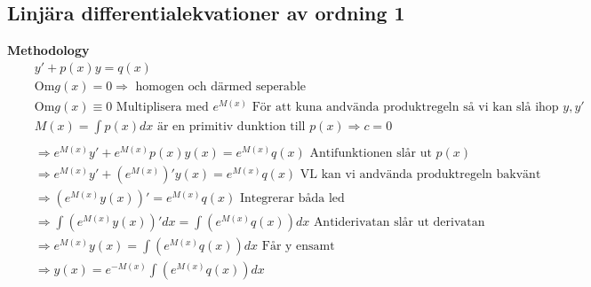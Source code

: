 \documentclass{article}
\begin{document}
\subsection{Linjära differentialekvationer av ordning 1}
\textbf{Methodology}  
\begin{align*}
  &\quad  y'+p(x)y = q(x)  \\
  &\quad  \text{Om} g(x)=0 \Rightarrow \text{ homogen och därmed seperable} \\
  &\quad  \text{Om} g(x)\equiv0 \text{ Multiplisera med } e^{M(x)} \text{ För att kuna andvända produktregeln
  så vi kan slå ihop } y, y' \\
  &\quad  M(x)= \int p(x)dx \text{ är en primitiv dunktion till } p(x) \Rightarrow c=0 \\
  &\quad  \\
  &\quad  \Rightarrow e^{M(x)}y'+e^{M(x)}p(x)y(x) = e^{M(x)}q(x) \text{ Antifunktionen slår ut } p(x) \\
  &\quad  \Rightarrow e^{M(x)}y'+(e^{M(x)})'y(x) = e^{M(x)}q(x)
  \text{ VL kan vi andvända produktregeln bakvänt} \\
  &\quad  \Rightarrow (e^{M(x)}y(x))' = e^{M(x)}q(x) \text{ Integrerar båda led} \\
  &\quad  \Rightarrow \int(e^{M(x)}y(x))'dx = \int(e^{M(x)}q(x))dx \text{ Antiderivatan slår ut derivatan } \\
  &\quad  \Rightarrow e^{M(x)}y(x) = \int(e^{M(x)}q(x))dx \text{ Får y ensamt } \\
  &\quad  \Rightarrow y(x) = e^{-M(x)} \int(e^{M(x)}q(x))dx \\
  &\quad  \\
\end{align*}
\end{document}
